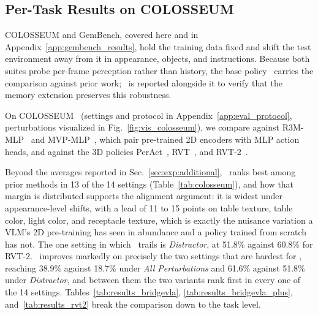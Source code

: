 \renewcommand{\dbltopfraction}{0.6}

\subsection{Per-Task Results on COLOSSEUM}
\label{app:colosseum_results}

COLOSSEUM and GemBench, covered here and in
Appendix~\ref{app:gembench_results}, hold the training data fixed and
shift the test environment away from it in appearance, objects, and
instructions.
Because both suites probe per-frame perception rather than history, the
base policy \method\ carries the comparison against prior work;
\memmethod\ is reported alongside it to verify that the memory
extension preserves this robustness.

On COLOSSEUM~\cite{pumacay2024colosseum} (settings and protocol in
Appendix~\ref{app:eval_protocol}, perturbations visualized in
Fig.~\ref{fig:vis_colosseum}), we compare against
R3M-MLP~\cite{nair2022r3m} and MVP-MLP~\cite{xiao2022masked}, which
pair pre-trained 2D encoders with MLP action heads, and against the 3D
policies PerAct~\cite{shridhar2023perceiver}, RVT~\cite{goyal2023rvt},
and RVT-2~\cite{goyal2024rvt}.

Beyond the averages reported in Sec.~\ref{sec:exp:additional}, \method\
ranks best among prior methods in 13 of the 14 settings
(Table~\ref{tab:colosseum}), and how that margin is distributed
supports the alignment argument: it is widest under appearance-level
shifts, with a lead of 11 to 15 points on table texture, table color,
light color, and receptacle texture, which is exactly the nuisance
variation a VLM's 2D pre-training has seen in abundance and a policy
trained from scratch has not.
The one setting in which \method\ trails is \emph{Distractor}, at
51.8\% against 60.8\% for RVT-2.
\memmethod\ improves markedly on precisely the two settings that are
hardest for \method, reaching 38.9\% against 18.7\% under \emph{All
Perturbations} and 61.6\% against 51.8\% under \emph{Distractor}, and
between them the two variants rank first in every one of the 14
settings.
Tables~\ref{tab:results_bridgevla},
\ref{tab:results_bridgevla_plus}, and~\ref{tab:results_rvt2} break the
comparison down to the task level.

